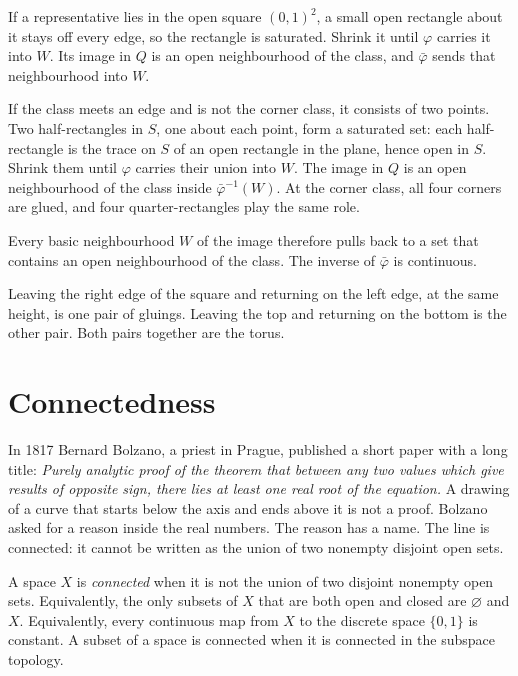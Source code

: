 If a representative lies in the open square $(0,1)^2$, a small open rectangle about it stays off every edge, so the rectangle is saturated. Shrink it until $\varphi$ carries it into $W$. Its image in $Q$ is an open neighbourhood of the class, and $\bar\varphi$ sends that neighbourhood into $W$.

If the class meets an edge and is not the corner class, it consists of two points. Two half-rectangles in $S$, one about each point, form a saturated set: each half-rectangle is the trace on $S$ of an open rectangle in the plane, hence open in $S$. Shrink them until $\varphi$ carries their union into $W$. The image in $Q$ is an open neighbourhood of the class inside $\bar\varphi^{-1}(W)$. At the corner class, all four corners are glued, and four quarter-rectangles play the same role.

Every basic neighbourhood $W$ of the image therefore pulls back to a set that contains an open neighbourhood of the class. The inverse of $\bar\varphi$ is continuous.

Leaving the right edge of the square and returning on the left edge, at the same height, is one pair of gluings. Leaving the top and returning on the bottom is the other pair. Both pairs together are the torus.

\section{Connectedness}

In 1817 Bernard Bolzano, a priest in Prague, published a short paper with a long title: \emph{Purely analytic proof of the theorem that between any two values which give results of opposite sign, there lies at least one real root of the equation.} A drawing of a curve that starts below the axis and ends above it is not a proof. Bolzano asked for a reason inside the real numbers. The reason has a name. The line is connected: it cannot be written as the union of two nonempty disjoint open sets.

\begin{definition}
A space $X$ is \emph{connected} when it is not the union of two disjoint nonempty open sets. Equivalently, the only subsets of $X$ that are both open and closed are $\varnothing$ and $X$. Equivalently, every continuous map from $X$ to the discrete space $\{0,1\}$ is constant. A subset of a space is connected when it is connected in the subspace topology.
\end{definition}

